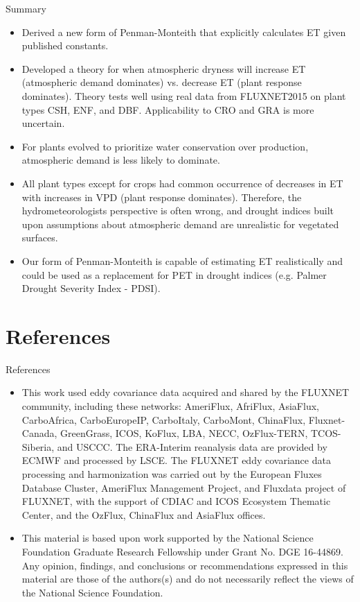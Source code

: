 \documentclass[aspectratio=169]{beamer}
\begin{document}
\begin{frame}{Summary}
  \small
  \begin{itemize}
  \item Derived a new form of Penman-Monteith that explicitly calculates ET given published constants.
  \item Developed a theory for when atmospheric dryness will increase ET (atmospheric demand dominates) vs. decrease ET (plant response dominates). Theory tests well using real data from FLUXNET2015 on plant types CSH, ENF, and DBF. Applicability to CRO and GRA is more uncertain.
  \item For plants evolved to prioritize water conservation over production, atmospheric demand is less likely to dominate.
  \item All plant types except for crops had common occurrence of decreases in ET with increases in VPD (plant response dominates). Therefore, the hydrometeorologists perspective is often wrong, and drought indices built upon assumptions about atmospheric demand are unrealistic for vegetated surfaces.
  \item Our form of Penman-Monteith is capable of estimating ET realistically and could be used as a replacement for PET in drought indices (e.g. Palmer Drought Severity Index - PDSI).
  \end{itemize}
\end{frame}

\section{References}
\begin{frame}{References}
  \AtNextBibliography{\small}
  \printbibliography
  \scriptsize
  \begin{itemize}
  \item This work used eddy covariance data acquired and shared by the FLUXNET community, including these networks: AmeriFlux, AfriFlux, AsiaFlux, CarboAfrica, CarboEuropeIP, CarboItaly, CarboMont, ChinaFlux, Fluxnet-Canada, GreenGrass, ICOS, KoFlux, LBA, NECC, OzFlux-TERN, TCOS-Siberia, and USCCC. The ERA-Interim reanalysis data are provided by ECMWF and processed by LSCE. The FLUXNET eddy covariance data processing and harmonization was carried out by the European Fluxes Database Cluster, AmeriFlux Management Project, and Fluxdata project of FLUXNET, with the support of CDIAC and ICOS Ecosystem Thematic Center, and the OzFlux, ChinaFlux and AsiaFlux offices.
    \item This material is based upon work supported by the National Science Foundation Graduate Research Fellowship under Grant No. DGE 16-44869. Any opinion, findings, and conclusions or recommendations expressed in this material are those of the authors(s) and do not necessarily reflect the views of the National Science Foundation.
    \end{itemize}
\end{frame}
\end{document}
